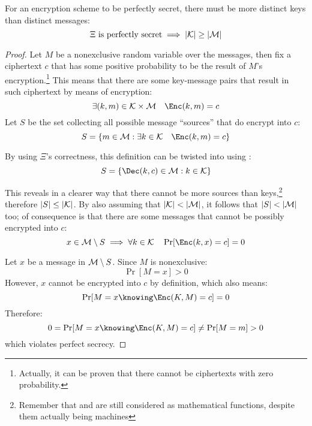 \begin{theorem}
    For an encryption scheme to be perfectly secret, there must be more distinct keys than distinct messages: 
    \[
        \Xi \textrm{ is perfectly secret} \implies |\mathcal{K}| \geq |\mathcal{M}|
    \]
\end{theorem}
\begin{proof}


    Let $M$ be a nonexclusive random variable over the messages, then fix a ciphertext $c$ that has some positive probability to be the result of $M$'s encryption.\footnote{Actually, it can be proven that there cannot be ciphertexts with zero probability.} This means that there are some key-message pairs that result in such ciphertext by means of encryption:
    \[
        \exists (k, m) \in \K \times \M \quad \Enc(k, m) = c
    \]
    Let $S$ be the set collecting all possible message ``sources'' that do encrypt into $c$:
    \[
        S = \{m \in \M : \exists k \in \K \quad \Enc(k, m) = c\}
    \]

    By using $\Xi$'s correctness, this definition can be twisted into using \Dec:
    \[
        S = \{\Dec(k, c) \in \M : k \in \K\}
    \]

    This reveals in a clearer way that there cannot be more sources than keys,\footnote{Remember that \Enc{} and \Dec{} are still considered as mathematical functions, despite them actually being machines} therefore $|S| \leq |\mathcal{K}|$. By also assuming that $|\mathcal{K}| < |\mathcal{M}|$, it follows that $|S| < |\mathcal{M}|$ too; of consequence is that there are some messages that cannot be possibly encrypted into $c$:
    \[
        x \in \M \setminus S \implies \forall k \in \K \quad \Pr[\Enc(k, x) = c] = 0
    \]

    Let $x$ be a message in $\mathcal{M} \setminus S$. Since $M$ is nonexclusive:
    \[
        \Pr[M = x] > 0
    \]
    However, $x$ cannot be encrypted into $c$ by definition, which also means:
    \[
        \Pr[M = x \knowing \Enc(K, M) = c] = 0
    \]
    Therefore:
    \[
        0 = \Pr[M = x \knowing \Enc(K, M) = c] \neq \Pr[M = m] > 0
    \]
    which violates perfect secrecy.
\end{proof}
